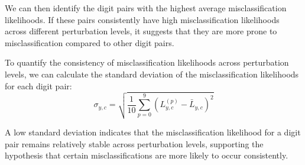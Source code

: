 We can then identify the digit pairs with the highest average misclassification likelihoods. If these pairs consistently have high misclassification likelihoods across different perturbation levels, it suggests that they are more prone to misclassification compared to other digit pairs.

To quantify the consistency of misclassification likelihoods across perturbation levels, we can calculate the standard deviation of the misclassification likelihoods for each digit pair:
\begin{equation}
\sigma_{y,c} = \sqrt{\frac{1}{10} \sum_{p=0}^9 (L^{(p)}_{y,c} - \bar{L}_{y,c})^2}    
\end{equation}


A low standard deviation indicates that the misclassification likelihood for a digit pair remains relatively stable across perturbation levels, supporting the hypothesis that certain misclassifications are more likely to occur consistently.
